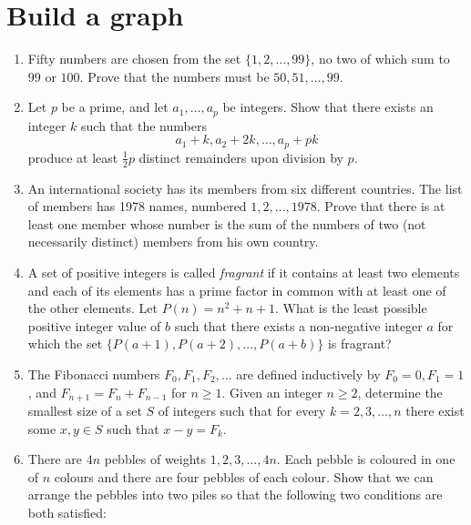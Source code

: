 \documentclass{article}
\begin{document}
\section{Build a graph}
\begin{enumerate}
    \item Fifty numbers are chosen from the set $\{1,2,\ldots,99\}$, no two of
        which sum to $99$ or $100$. Prove that the numbers must be
        $50,51,\ldots,99$.
    \item Let $p$ be a prime, and let $a_1, \dots, a_p$ be integers. Show that
        there exists an integer $k$ such that the numbers
        \[a_1 + k, a_2 + 2k, \dots, a_p + pk\]produce at least $\tfrac{1}{2} p$
        distinct remainders upon division by $p$.
    \item An international society has its members from six different
        countries. The list of members has 1978 names, numbered $1, 2,
        \ldots, 1978$. Prove that there is at least one member whose
        number is the sum of the numbers of two (not necessarily
    distinct) members from his own country. 
\item A set of positive integers is called \emph{fragrant} if it contains at least two
    elements and each of its elements has a prime factor in common with at least
    one of the other elements. Let $P(n)=n^2+n+1$. What is the least possible
    positive integer value of $b$ such that there exists a non-negative integer
    $a$ for which the set $\{P(a+1),P(a+2),\ldots,P(a+b)\}$ is fragrant?
    \item The Fibonacci numbers $F_0, F_1, F_2, . . .$ are defined inductively
        by $F_0=0, F_1=1$, and $F_{n+1}=F_n+F_{n-1}$ for $n \ge 1$. Given an
        integer $n \ge 2$, determine the smallest size of a set $S$ of integers
        such that for every $k=2, 3, \ldots , n$ there exist some $x, y \in S$
        such that $x-y=F_k$.
    \item  There are $4n$ pebbles of weights $1, 2, 3, \dots, 4n.$ Each pebble
        is coloured in one of $n$ colours and there are four pebbles of each
        colour. Show that we can arrange the pebbles into two piles so that the
        following two conditions are both satisfied:


\end{enumerate}
\end{document}

